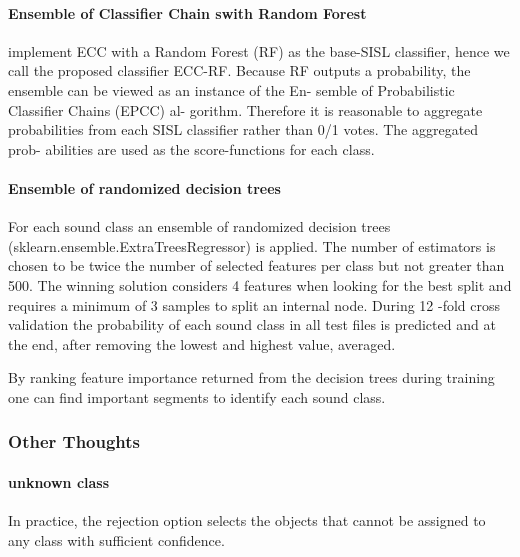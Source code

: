 \paragraph{Ensemble of Classifier Chain swith Random Forest}

\cite{mlsp2} implement ECC \cite{read2011classifier} with a Random Forest (RF) as
the base-SISL classifier, hence we call the proposed
classifier ECC-RF. Because RF outputs a probability,
the ensemble can be viewed as an instance of the En-
semble of Probabilistic Classifier Chains (EPCC) al-
gorithm. Therefore it is
reasonable to aggregate probabilities from each SISL
classifier rather than 0/1 votes. The aggregated prob-
abilities are used as the score-functions for each class.

\paragraph{Ensemble of randomized decision trees}

\cite{Lasseck13} For each sound class an ensemble of
randomized decision trees (sklearn.ensemble.ExtraTreesRegressor) is applied. The number
of estimators is chosen to be twice the number of selected features per class but not greater
than 500. The winning solution considers 4 features when looking for the best split and
requires a minimum of 3 samples to split an internal node. During 12 -fold cross validation
the probability of each sound class in all test files is predicted and at the end, after removing
the lowest and highest value, averaged.

By ranking feature importance returned from the decision trees during training one can find
important segments to identify each sound class. 




\subsubsection{Other Thoughts}

\paragraph{unknown class}

In practice, the rejection option selects the objects that cannot be assigned to any class with sufficient confidence.

